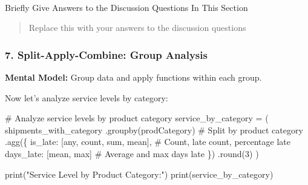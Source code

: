 \documentclass[
  letterpaper,
  DIV=11,
  numbers=noendperiod]{scrartcl}
\makeatletter
\let\oldparagraph\paragraph
\renewcommand{\paragraph}{
    \@ifstar
      \xxxParagraphStar
      \xxxParagraphNoStar
  }
\newcommand{\xxxParagraphStar}[1]{\oldparagraph*{#1}\mbox{}}
\newcommand{\xxxParagraphNoStar}[1]{\oldparagraph{#1}\mbox{}}
\newenvironment{Shaded}{\begin{snugshade}}{\end{snugshade}}
\newcommand{\BuiltInTok}[1]{\textcolor[rgb]{0.00,0.23,0.31}{#1}}
\newcommand{\CommentTok}[1]{\textcolor[rgb]{0.37,0.37,0.37}{#1}}
\newcommand{\DecValTok}[1]{\textcolor[rgb]{0.68,0.00,0.00}{#1}}
\newcommand{\NormalTok}[1]{\textcolor[rgb]{0.00,0.23,0.31}{#1}}
\newcommand{\OperatorTok}[1]{\textcolor[rgb]{0.37,0.37,0.37}{#1}}
\newcommand{\StringTok}[1]{\textcolor[rgb]{0.13,0.47,0.30}{#1}}
\makeatother
\begin{document}
\paragraph{Briefly Give Answers to the Discussion Questions In This
Section}\label{briefly-give-answers-to-the-discussion-questions-in-this-section-5}

\begin{quote}
Replace this with your answers to the discussion questions
\end{quote}

\subsubsection{7. Split-Apply-Combine: Group
Analysis}\label{split-apply-combine-group-analysis}

\textbf{Mental Model:} Group data and apply functions within each group.

Now let's analyze service levels by category:

\label{mental-model-7-groupby}
\begin{Shaded}
\begin{Highlighting}[]
\CommentTok{\# Analyze service levels by product category}
\NormalTok{service\_by\_category }\OperatorTok{=}\NormalTok{ (}
\NormalTok{    shipments\_with\_category}
\NormalTok{    .groupby(}\StringTok{\textquotesingle{}prodCategory\textquotesingle{}}\NormalTok{)  }\CommentTok{\# Split by product category}
\NormalTok{    .agg(\{}
        \StringTok{\textquotesingle{}is\_late\textquotesingle{}}\NormalTok{: [}\StringTok{\textquotesingle{}any\textquotesingle{}}\NormalTok{, }\StringTok{\textquotesingle{}count\textquotesingle{}}\NormalTok{, }\StringTok{\textquotesingle{}sum\textquotesingle{}}\NormalTok{, }\StringTok{\textquotesingle{}mean\textquotesingle{}}\NormalTok{],  }\CommentTok{\# Count, late count, percentage late}
        \StringTok{\textquotesingle{}days\_late\textquotesingle{}}\NormalTok{: [}\StringTok{\textquotesingle{}mean\textquotesingle{}}\NormalTok{, }\StringTok{\textquotesingle{}max\textquotesingle{}}\NormalTok{]  }\CommentTok{\# Average and max days late}
\NormalTok{    \})}
\NormalTok{    .}\BuiltInTok{round}\NormalTok{(}\DecValTok{3}\NormalTok{)}
\NormalTok{)}

\BuiltInTok{print}\NormalTok{(}\StringTok{"Service Level by Product Category:"}\NormalTok{)}
\BuiltInTok{print}\NormalTok{(service\_by\_category)}
\end{Highlighting}
\end{Shaded}
\end{document}
